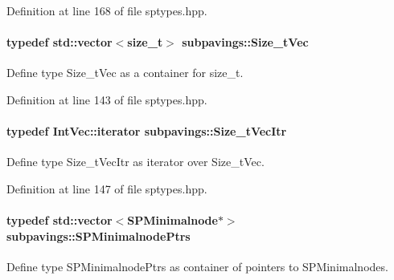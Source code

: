 \-Definition at line 168 of file sptypes.\-hpp.

\hypertarget{namespacesubpavings_a612fc5639b45583b9fd33bd304354f81}{
\paragraph[{\-Size\-\_\-t\-Vec}]{\setlength{\rightskip}{0pt plus 5cm}typedef std\-::vector$<$size\-\_\-t$>$ {\bf subpavings\-::\-Size\-\_\-t\-Vec}}}\label{namespacesubpavings_a612fc5639b45583b9fd33bd304354f81}


\-Define type \-Size\-\_\-t\-Vec as a container for size\-\_\-t. 



\-Definition at line 143 of file sptypes.\-hpp.

\hypertarget{namespacesubpavings_a764c7dafc0022ded276050b8cd056904}{
\paragraph[{\-Size\-\_\-t\-Vec\-Itr}]{\setlength{\rightskip}{0pt plus 5cm}typedef \-Int\-Vec\-::iterator {\bf subpavings\-::\-Size\-\_\-t\-Vec\-Itr}}}\label{namespacesubpavings_a764c7dafc0022ded276050b8cd056904}


\-Define type \-Size\-\_\-t\-Vec\-Itr as iterator over \-Size\-\_\-t\-Vec. 



\-Definition at line 147 of file sptypes.\-hpp.

\hypertarget{namespacesubpavings_ad21343865a1d93618e0fad6b4b08e53e}{
\paragraph[{\-S\-P\-Minimalnode\-Ptrs}]{\setlength{\rightskip}{0pt plus 5cm}typedef std\-::vector$<$\-S\-P\-Minimalnode$\ast$$>$ {\bf subpavings\-::\-S\-P\-Minimalnode\-Ptrs}}}\label{namespacesubpavings_ad21343865a1d93618e0fad6b4b08e53e}


\-Define type \-S\-P\-Minimalnode\-Ptrs as container of pointers to \-S\-P\-Minimalnodes. 



